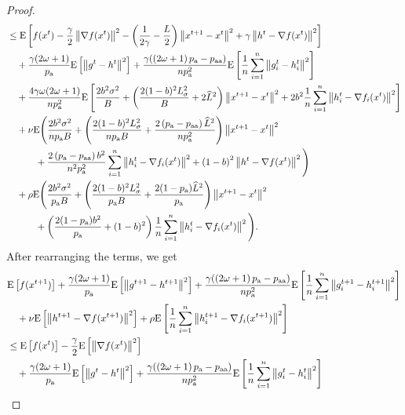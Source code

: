 \documentclass{article}
\newcommand*{\probavailable}{\ensuremath{p_{\textnormal{a}}}}
\newcommand*{\probpairaa}{\ensuremath{p_{\textnormal{aa}}}}
\begin{document}
\begin{proof}
\begin{align*}
      &\leq \Exp{f(x^t) - \frac{\gamma}{2}\norm{\nabla f(x^t)}^2 - \left(\frac{1}{2\gamma} - \frac{L}{2}\right)
      \norm{x^{t+1} - x^t}^2 + \gamma \norm{h^{t} - \nabla f(x^t)}^2}\nonumber\\
      &\quad + \frac{\gamma (2 \omega + 1)}{\probavailable}\Exp{\norm{g^{t} - h^t}^2}+ \frac{\gamma (\left(2 \omega + 1\right)\probavailable - \probpairaa)}{n \probavailable^2}\Exp{\frac{1}{n} \sum_{i=1}^n\norm{g^t_i - h^{t}_i}^2} \\
      &\quad + \frac{4 \gamma \omega (2 \omega + 1)}{n \probavailable^2} \Exp{\frac{2 b^2 \sigma^2}{B} + \left(\frac{2 (1 - b)^2 L_{\sigma}^2}{B} + 2 \widehat{L}^2\right)\norm{x^{t+1} - x^{t}}^2 + 2 b^2 \frac{1}{n} \sum_{i=1}^n \norm{h^t_i - \nabla f_i(x^{t})}^2} \\
      &\quad  + \nu {\rm E}\Bigg(\frac{2 b^2 \sigma^2}{n \probavailable B} + \left(\frac{2 (1 - b)^2 L_{\sigma}^2}{n \probavailable B} + \frac{2\left(\probavailable - \probpairaa\right) \widehat{L}^2}{n \probavailable^2} \right) \norm{x^{t+1} - x^{t}}^2\\
      &\qquad\quad + \frac{2 \left(\probavailable - \probpairaa\right) b^2}{n^2 \probavailable^2} \sum_{i=1}^n \norm{h^t_i - \nabla f_i(x^{t})}^2 + \left(1 - b\right)^2 \norm{h^{t} - \nabla f(x^{t})}^2\Bigg) \\
      &\quad + \rho {\rm E}\Bigg(\frac{2 b^2 \sigma^2}{\probavailable B}  + \left(\frac{2 (1 - b)^2 L_{\sigma}^2}{\probavailable B} + \frac{2(1 - \probavailable) \widehat{L}^2}{\probavailable}\right)\norm{x^{t+1} - x^{t}}^2 \\
      &\qquad\quad + \left(\frac{2 (1 - \probavailable) b^2}{\probavailable} + (1 - b)^2\right) \frac{1}{n} \sum_{i=1}^n \norm{h^t_i - \nabla f_i(x^{t})}^2\Bigg).
    \end{align*}
    After rearranging the terms, we get
    \begin{align*}
      &\Exp{f(x^{t + 1})} + \frac{\gamma (2 \omega + 1)}{\probavailable} \Exp{\norm{g^{t+1} - h^{t+1}}^2} + \frac{\gamma (\left(2 \omega + 1\right)\probavailable - \probpairaa)}{n \probavailable^2} \Exp{\frac{1}{n}\sum_{i=1}^n\norm{g^{t+1}_i - h^{t+1}_i}^2}\\
      &\quad  + \nu \Exp{\norm{h^{t+1} - \nabla f(x^{t+1})}^2} + \rho \Exp{\frac{1}{n}\sum_{i=1}^n\norm{h^{t+1}_i - \nabla f_i(x^{t+1})}^2}\\
      &\leq \Exp{f(x^t)} - \frac{\gamma}{2}\Exp{\norm{\nabla f(x^t)}^2} \\
      &\quad + \frac{\gamma (2 \omega + 1)}{\probavailable} \Exp{\norm{g^{t} - h^{t}}^2} + \frac{\gamma (\left(2 \omega + 1\right)\probavailable - \probpairaa)}{n \probavailable^2} \Exp{\frac{1}{n}\sum_{i=1}^n\norm{g^{t}_i - h^{t}_i}^2} \\

\end{align*}
\end{proof}
\end{document}
